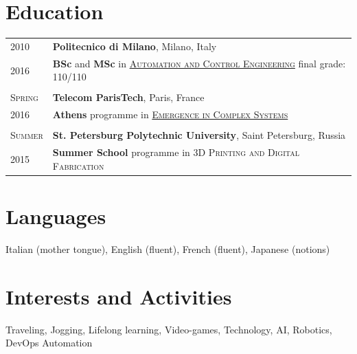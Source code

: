 \documentclass[a4paper,10pt]{article}
\begin{document}
   \section{Education}
      \begin{tabular}{p{1.7cm}|p{15.5cm}}
         \centering\textsc{2010} & \textbf{Politecnico di Milano}, Milano, Italy\\
         \centering\textsc{2016} & \textbf{BSc} and \textbf{MSc} in \textsc{\href{http://www.polinternational.polimi.it/educational-offer/laurea-magistrale-equivalent-to-master-of-science-programmes/automation-and-control-engineering/}{Automation and Control Engineering}} \hfill final grade: \textsc{110/110} \\ 
         
         \multicolumn{2}{c}{} \\
         \centering\textsc{Spring} & \textbf{Telecom ParisTech}, Paris, France\\
         \centering\textsc{2016}   & \textbf{Athens} programme in \textsc{\href{http://www.athensprogramme.com/catalog/show/1640}{Emergence in Complex Systems}}\\
         
         \multicolumn{2}{c}{} \\
         \centering\textsc{Summer} & \textbf{St. Petersburg Polytechnic University}, Saint Petersburg, Russia\\
         \centering\textsc{2015}   & \textbf{Summer School} programme in \textsc{3D Printing and Digital Fabrication}\\
      \end{tabular}

   \section{Languages}
   Italian (mother tongue), English (fluent), French (fluent), Japanese (notions)

   \section{Interests and Activities}
   Traveling, Jogging, Lifelong learning, Video-games, Technology, AI, Robotics, DevOps Automation
\end{document}
